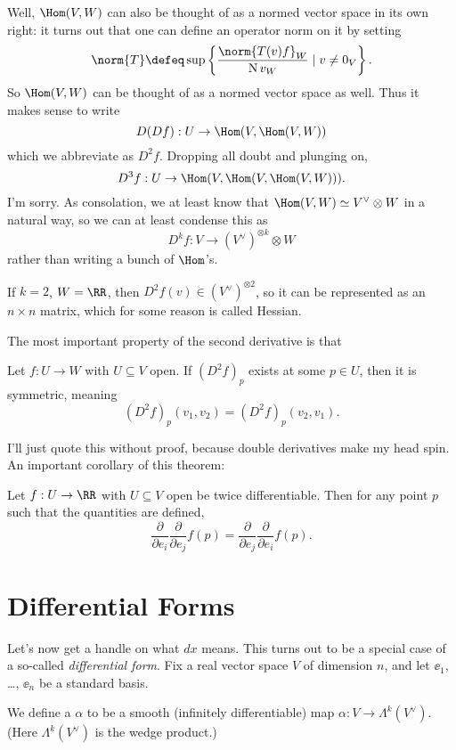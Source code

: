 \documentclass[11pt]{scrreprt}
\begin{document}
Well, $\Hom(V,W)$ can also be thought of as a normed vector space in its own right:
it turns out that one can define an operator norm on it by setting
\[ \norm{T} \defeq \sup \left\{ \frac{\norm{T(v)f}_W}{\Norm{v}_W} \mid v \neq 0_V \right\}. \] 
So $\Hom(V,W)$ can be thought of as a normed vector space as well.
Thus it makes sense to write
\[ D(Df) : U \to \Hom(V,\Hom(V,W)) \]
which we abbreviate as $D^2 f$. Dropping all doubt and plunging on,
\[ D^3f : U \to \Hom(V, \Hom(V,\Hom(V,W))). \]
I'm sorry.
As consolation, we at least know that $\Hom(V,W) \simeq V^\vee \otimes W$ in a natural way,
so we can at least condense this as
\[ D^kf : V \to (V^\vee)^{\otimes k} \otimes W \]
rather than writing a bunch of $\Hom$'s.
\begin{remark}
	If $k=2$, $W = \RR$, then $D^2f(v) \in (V^\vee)^{\otimes 2}$,
	so it can be represented as an $n \times n$ matrix, which for some reason is called Hessian.
\end{remark}
The most important property of the second derivative is that
\begin{theorem}
	[Symmetry of $Df^2$]
	Let $f : U \to W$ with $U \subseteq V$ open.
	If $(D^2f)_p$ exists at some $p \in U$, then it is symmetric, meaning
	\[ (D^2f)_p(v_1, v_2) = (D^2f)_p(v_2, v_1). \]
\end{theorem}
I'll just quote this without proof, because double derivatives make my head spin.
An important corollary of this theorem:
\begin{corollary}
	Let $f : U \to \RR$ with $U \subseteq V$ open be twice differentiable.
	Then for any point $p$ such that the quantities are defined,
	\[
		\frac{\partial}{\partial e_i}
		\frac{\partial}{\partial e_j}
		f(p)
		=
		\frac{\partial}{\partial e_j}
		\frac{\partial}{\partial e_i}
		f(p).
	\]
\end{corollary}

\section{Differential Forms}

Let's now get a handle on what $dx$ means. This turns out to be a special case of a so-called \emph{differential form}.
Fix a real vector space $V$ of dimension $n$, and let $\ee_1$, \dots, $\ee_n$ be a standard basis.

\begin{definition}
	We define a  $\alpha$ to be a smooth (infinitely differentiable)
	map $\alpha : V \to \Lambda^k(V^\vee)$.
	(Here $\Lambda^k(V^\vee)$ is the wedge product.)
\end{definition}
\end{document}
